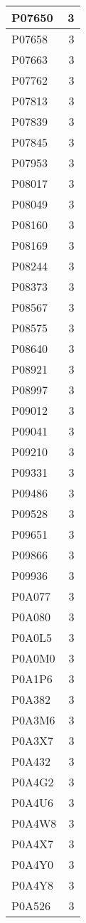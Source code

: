\documentclass[
]{book}
\theoremstyle{definition}
\theoremstyle{definition}
\theoremstyle{definition}
\theoremstyle{definition}
\theoremstyle{remark}
\begin{document}
\begin{table}
\begin{tabular}{l|r}
\hline
P07650 & 3\\
\hline
P07658 & 3\\
\hline
P07663 & 3\\
\hline
P07762 & 3\\
\hline
P07813 & 3\\
\hline
P07839 & 3\\
\hline
P07845 & 3\\
\hline
P07953 & 3\\
\hline
P08017 & 3\\
\hline
P08049 & 3\\
\hline
P08160 & 3\\
\hline
P08169 & 3\\
\hline
P08244 & 3\\
\hline
P08373 & 3\\
\hline
P08567 & 3\\
\hline
P08575 & 3\\
\hline
P08640 & 3\\
\hline
P08921 & 3\\
\hline
P08997 & 3\\
\hline
P09012 & 3\\
\hline
P09041 & 3\\
\hline
P09210 & 3\\
\hline
P09331 & 3\\
\hline
P09486 & 3\\
\hline
P09528 & 3\\
\hline
P09651 & 3\\
\hline
P09866 & 3\\
\hline
P09936 & 3\\
\hline
P0A077 & 3\\
\hline
P0A080 & 3\\
\hline
P0A0L5 & 3\\
\hline
P0A0M0 & 3\\
\hline
P0A1P6 & 3\\
\hline
P0A382 & 3\\
\hline
P0A3M6 & 3\\
\hline
P0A3X7 & 3\\
\hline
P0A432 & 3\\
\hline
P0A4G2 & 3\\
\hline
P0A4U6 & 3\\
\hline
P0A4W8 & 3\\
\hline
P0A4X7 & 3\\
\hline
P0A4Y0 & 3\\
\hline
P0A4Y8 & 3\\
\hline
P0A526 & 3\\

\end{tabular}
\end{table}
\end{document}
